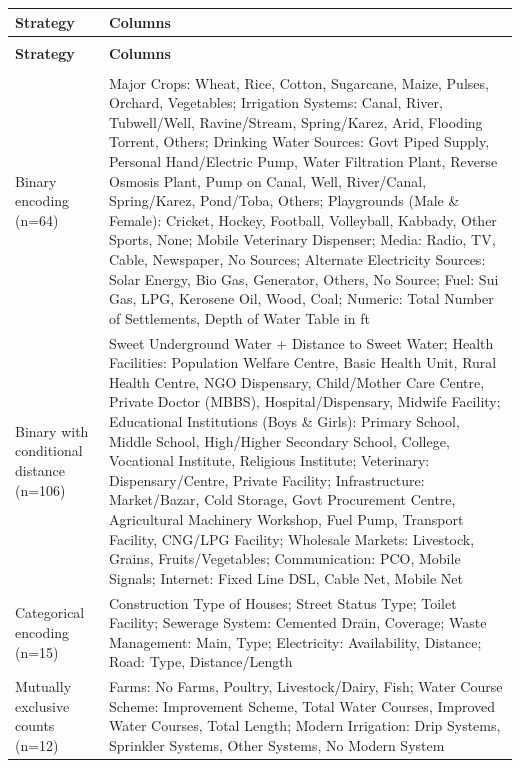 \documentclass[10pt,a4paper]{article}
\begin{document}
{\small
\begin{longtable}{>{\raggedright\arraybackslash}p{3.8cm}>{\raggedright\arraybackslash}p{12cm}}
\toprule
\textbf{Strategy} & \textbf{Columns} \\
\midrule
\endfirsthead

\multicolumn{2}{c}{\textit{Table \thetable\ -- Continued from previous page}} \\
\toprule
\textbf{Strategy} & \textbf{Columns} \\
\midrule
\endhead

\midrule
\multicolumn{2}{r}{\textit{Continued on next page}} \\
\endfoot

\bottomrule
\multicolumn{2}{l}{\textbf{Table \thetable: Data Cleaning Strategies }} \label{tab:cleaning_strategies}
\endlastfoot

Binary encoding (n=64) & Major Crops: Wheat, Rice, Cotton, Sugarcane, Maize, Pulses, Orchard, Vegetables; Irrigation Systems: Canal, River, Tubwell/Well, Ravine/Stream, Spring/Karez, Arid, Flooding Torrent, Others; Drinking Water Sources: Govt Piped Supply, Personal Hand/Electric Pump, Water Filtration Plant, Reverse Osmosis Plant, Pump on Canal, Well, River/Canal, Spring/Karez, Pond/Toba, Others; Playgrounds (Male \& Female): Cricket, Hockey, Football, Volleyball, Kabbady, Other Sports, None; Mobile Veterinary Dispenser; Media: Radio, TV, Cable, Newspaper, No Sources; Alternate Electricity Sources: Solar Energy, Bio Gas, Generator, Others, No Source; Fuel: Sui Gas, LPG, Kerosene Oil, Wood, Coal; Numeric: Total Number of Settlements, Depth of Water Table in ft \\
\midrule

Binary with conditional distance (n=106) & Sweet Underground Water + Distance to Sweet Water; Health Facilities: Population Welfare Centre, Basic Health Unit, Rural Health Centre, NGO Dispensary, Child/Mother Care Centre, Private Doctor (MBBS), Hospital/Dispensary, Midwife Facility; Educational Institutions (Boys \& Girls): Primary School, Middle School, High/Higher Secondary School, College, Vocational Institute, Religious Institute; Veterinary: Dispensary/Centre, Private Facility; Infrastructure: Market/Bazar, Cold Storage, Govt Procurement Centre, Agricultural Machinery Workshop, Fuel Pump, Transport Facility, CNG/LPG Facility; Wholesale Markets: Livestock, Grains, Fruits/Vegetables; Communication: PCO, Mobile Signals; Internet: Fixed Line DSL, Cable Net, Mobile Net \\
\midrule

Categorical encoding (n=15) & Construction Type of Houses; Street Status Type; Toilet Facility; Sewerage System: Cemented Drain, Coverage; Waste Management: Main, Type; Electricity: Availability, Distance; Road: Type, Distance/Length \\
\midrule

Mutually exclusive counts (n=12) & Farms: No Farms, Poultry, Livestock/Dairy, Fish; Water Course Scheme: Improvement Scheme, Total Water Courses, Improved Water Courses, Total Length; Modern Irrigation: Drip Systems, Sprinkler Systems, Other Systems, No Modern System \\

\end{longtable}
}
\end{document}
